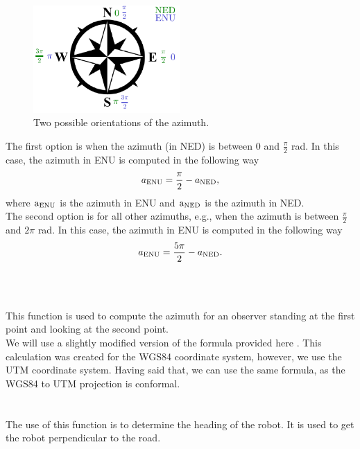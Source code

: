             \begin{figure}[ht]
                \centering
                \includegraphics[width=0.5\textwidth]{images/direction_indicator.pdf}
                \caption{Two possible orientations of the azimuth.}
                \label{fig:dir_indi}
            \end{figure}
            \noindent The first option is when the azimuth (in NED) is between 0 and $\frac{\pi}{2}$ rad. In this case, the azimuth in ENU is computed in the following way
            \begin{equation}
                a_{\rm{ENU}} = \frac{\pi}{2} - a_{\rm{NED}},
            \end{equation}
            where $\text{a}_{\rm{ENU}}$ is the azimuth in ENU and $\text{a}_{\rm{NED}}$ is the azimuth in NED.\\
            The second option is for all other azimuths, e.g., when the azimuth is between $\frac{\pi}{2}$ and $2\pi$ rad. In this case, the azimuth in ENU is computed in the following way
            \begin{equation}
                a_{\rm{ENU}} = \frac{5\pi}{2} - a_{\rm{NED}}.
            \end{equation}\\\\
        \\
            This function is used to compute the azimuth for an observer standing at the first point and looking at the second point.\\
            We will use a slightly modified version of the formula provided here \cite{calc_bearing}. This calculation was created for the WGS84 coordinate system, however, we use the UTM coordinate system. Having said that, we can use the same formula, as the WGS84 to UTM projection is conformal\cite{Map_projections}.\\\\
        \\
            The use of this function is to determine the heading of the robot. It is used to get the robot perpendicular to the road.\\
